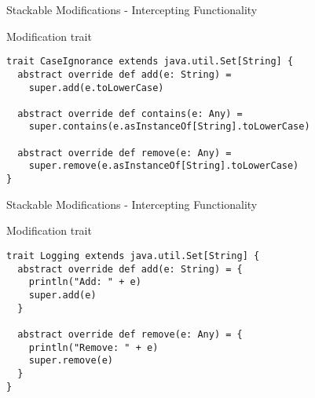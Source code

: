 \begin{frame}[fragile]{Stackable Modifications - Intercepting Functionality}
\begin{exampleblock}{Modification trait}
\begin{lstlisting}
trait CaseIgnorance extends java.util.Set[String] {
  abstract override def add(e: String) =
    super.add(e.toLowerCase)

  abstract override def contains(e: Any) =
    super.contains(e.asInstanceOf[String].toLowerCase)

  abstract override def remove(e: Any) =
    super.remove(e.asInstanceOf[String].toLowerCase)
}
\end{lstlisting}
\end{exampleblock}
\end{frame}

\begin{frame}[fragile]{Stackable Modifications - Intercepting Functionality}
\begin{exampleblock}{Modification trait}
\begin{lstlisting}
trait Logging extends java.util.Set[String] {
  abstract override def add(e: String) = {
    println("Add: " + e)
    super.add(e)
  }

  abstract override def remove(e: Any) = {
    println("Remove: " + e)
    super.remove(e)
  }
}
\end{lstlisting}
\end{exampleblock}
\end{frame}

